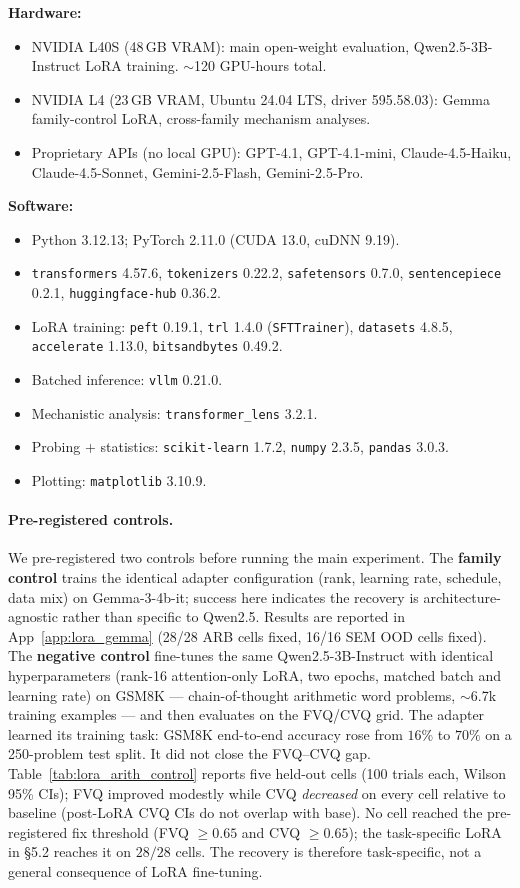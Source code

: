 \documentclass[letterpaper]{article} %
\begin{document}
\textbf{Hardware:}
\begin{itemize}\setlength\itemsep{0pt}
\item NVIDIA L40S (48\,GB VRAM): main open-weight evaluation,
  Qwen2.5-3B-Instruct LoRA training. $\sim$120 GPU-hours total.
\item NVIDIA L4 (23\,GB VRAM, Ubuntu 24.04 LTS, driver 595.58.03):
  Gemma family-control LoRA, cross-family mechanism analyses.
\item Proprietary APIs (no local GPU): GPT-4.1, GPT-4.1-mini,
  Claude-4.5-Haiku, Claude-4.5-Sonnet, Gemini-2.5-Flash,
  Gemini-2.5-Pro.
\end{itemize}

\textbf{Software:}
\begin{itemize}\setlength\itemsep{0pt}
\item Python 3.12.13; PyTorch 2.11.0 (CUDA 13.0, cuDNN 9.19).
\item \texttt{transformers} 4.57.6, \texttt{tokenizers} 0.22.2,
  \texttt{safetensors} 0.7.0, \texttt{sentencepiece} 0.2.1,
  \texttt{huggingface-hub} 0.36.2.
\item LoRA training: \texttt{peft} 0.19.1, \texttt{trl} 1.4.0
  (\texttt{SFTTrainer}), \texttt{datasets} 4.8.5,
  \texttt{accelerate} 1.13.0, \texttt{bitsandbytes} 0.49.2.
\item Batched inference: \texttt{vllm} 0.21.0.
\item Mechanistic analysis: \texttt{transformer\_lens} 3.2.1.
\item Probing + statistics: \texttt{scikit-learn} 1.7.2,
  \texttt{numpy} 2.3.5, \texttt{pandas} 3.0.3.
\item Plotting: \texttt{matplotlib} 3.10.9.
\end{itemize}

\paragraph{Pre-registered controls.}
We pre-registered two controls before running the main experiment.
The \textbf{family control} trains the identical adapter
configuration (rank, learning rate, schedule, data mix) on
Gemma-3-4b-it; success here indicates the recovery is
architecture-agnostic rather than specific to Qwen2.5. Results
are reported in App~\ref{app:lora_gemma} (28/28 ARB cells fixed,
16/16 SEM OOD cells fixed).
The \textbf{negative control} fine-tunes the same Qwen2.5-3B-Instruct
with identical hyperparameters (rank-16 attention-only LoRA, two
epochs, matched batch and learning rate) on GSM8K --- chain-of-thought
arithmetic word problems, $\sim$6.7k training examples --- and then
evaluates on the FVQ/CVQ grid. The adapter learned its training
task: GSM8K end-to-end accuracy rose from $16\%$ to $70\%$ on a
250-problem test split. It did not close the FVQ--CVQ gap.
Table~\ref{tab:lora_arith_control} reports five held-out cells
(100 trials each, Wilson 95\% CIs); FVQ improved modestly while CVQ
\emph{decreased} on every cell relative to baseline (post-LoRA CVQ
CIs do not overlap with base). No cell reached the pre-registered
fix threshold (FVQ $\geq 0.65$ and CVQ $\geq 0.65$); the
task-specific LoRA in \S5.2 reaches it on
$28/28$ cells. The recovery is therefore task-specific, not a
general consequence of LoRA fine-tuning.
\end{document}
